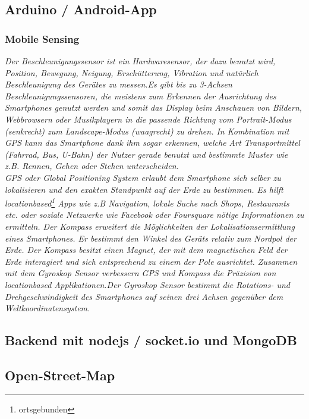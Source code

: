 \subsection{Arduino / Android-App}
\subsubsection{Mobile Sensing}
\textit{Der Beschleunigungssensor ist ein Hardwaresensor, der dazu benutzt wird, Position, Bewegung, Neigung, Erschütterung, Vibration und natürlich Beschleunigung des Gerätes zu messen.Es gibt bis zu 3-Achsen Beschleunigungssensoren, die meistens zum Erkennen der Ausrichtung des Smartphones genutzt werden und somit das Display beim Anschauen von Bildern, Webbrowsern oder Musikplayern in die passende Richtung vom Portrait-Modus (senkrecht) zum Landscape-Modus (waagrecht) zu drehen. In Kombination mit GPS kann das Smartphone dank ihm sogar erkennen, welche Art Transportmittel (Fahrrad, Bus, U-Bahn) der Nutzer gerade benutzt und bestimmte Muster wie z.B. Rennen, Gehen oder Stehen unterscheiden.\\
GPS oder Global Positioning System erlaubt dem Smartphone sich selber zu lokalisieren und den exakten Standpunkt auf der Erde zu bestimmen. Es hilft locationbased\footnote{ortsgebunden} Apps wie z.B Navigation, lokale Suche nach Shops, Restaurants etc. oder soziale Netzwerke wie Facebook oder Foursquare nötige Informationen zu ermitteln. Der Kompass erweitert die Möglichkeiten der Lokalisationsermittlung eines Smartphones. Er bestimmt den Winkel des Geräts relativ zum Nordpol der Erde. Der Kompass besitzt einen Magnet, der mit dem magnetischen Feld der Erde interagiert und sich entsprechend zu einem der Pole ausrichtet. Zusammen mit dem Gyroskop Sensor verbessern GPS und Kompass die Präzision von locationbased Applikationen.Der Gyroskop Sensor bestimmt die Rotations- und Drehgeschwindigkeit des Smartphones auf seinen drei Achsen gegenüber dem Weltkoordinatensystem.}
\subsection{Backend mit nodejs / socket.io und MongoDB}
\subsection{Open-Street-Map}
